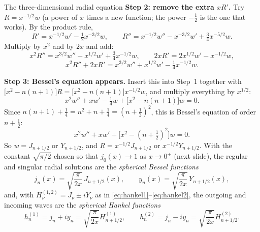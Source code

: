 \documentclass[11pt]{beamer}
\begin{document}
\begin{frame}[allowframebreaks=1.00]{The three-dimensional radial equation}
\textbf{Step 2: remove the extra \(xR'\).} Try \(R=x^{-1/2}w\) (a power of \(x\) times a new function; the power
\(-\frac12\) is the one that works). By the product rule,
\[
 R'=x^{-1/2}w'-\tfrac12x^{-3/2}w,\qquad
 R''=x^{-1/2}w''-x^{-3/2}w'+\tfrac34x^{-5/2}w .
\]
Multiply by \(x^2\) and by \(2x\) and add:
\[
 x^2R''=x^{3/2}w''-x^{1/2}w'+\tfrac34x^{-1/2}w,\qquad
 2xR'=2x^{1/2}w'-x^{-1/2}w,
\]
\[
 x^2R''+2xR'=x^{3/2}w''+x^{1/2}w'-\tfrac14x^{-1/2}w .
\]
\par\framebreak\par
\textbf{Step 3: Bessel's equation appears.} Insert this into Step~1 together with
\(\bigl[x^2-n(n+1)\bigr]R=\bigl[x^2-n(n+1)\bigr]x^{-1/2}w\), and multiply everything by \(x^{1/2}\):
\[
 x^2w''+xw'-\tfrac14w+\bigl[x^2-n(n+1)\bigr]w=0 .
\]
Since \(n(n+1)+\tfrac14=n^2+n+\tfrac14=(n+\tfrac12)^2\), this is Bessel's equation of order \(n+\frac12\):
\[
 x^2w''+xw'+\bigl[x^2-(n+\tfrac12)^2\bigr]w=0.
\]
So $w=J_{n+1/2}$ or $Y_{n+1/2}$, and
$R=x^{-1/2}J_{n+1/2}$ or $x^{-1/2}Y_{n+1/2}$. With the constant
$\sqrt{\pi/2}$ chosen so that $j_0(x)\to1$ as $x\to0^+$ (next slide), the regular and
singular radial solutions are the \emph{spherical Bessel functions}
\begin{equation}
 j_n(x)=\sqrt{\frac{\pi}{2x}}\,J_{n+1/2}(x),\qquad
 y_n(x)=\sqrt{\frac{\pi}{2x}}\,Y_{n+1/2}(x),
 \label{eq:spherical-jy}
\end{equation}
and, with $H_\nu^{(1,2)}=J_\nu\pm iY_\nu$ as in \eqref{eq:hankel1}--\eqref{eq:hankel2}, the
outgoing and incoming waves are the \emph{spherical Hankel functions}
\begin{equation}
 h_n^{(1)}=j_n+iy_n=\sqrt{\frac{\pi}{2x}}H_{n+1/2}^{(1)},\qquad
 h_n^{(2)}=j_n-iy_n=\sqrt{\frac{\pi}{2x}}H_{n+1/2}^{(2)}.
 \label{eq:spherical-h}
\end{equation}
\end{frame}
\end{document}
